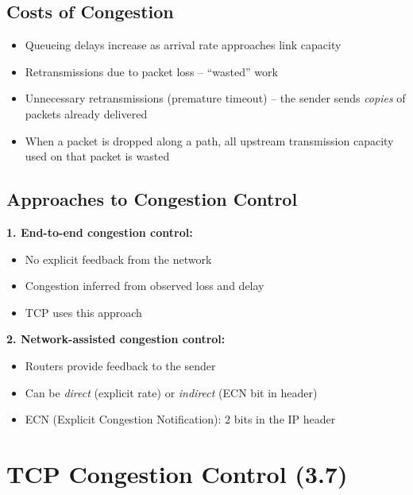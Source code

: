 \subsection{Costs of Congestion}

\begin{warnbox}
\begin{itemize}[noitemsep]
    \item Queueing delays increase as arrival rate approaches link capacity
    \item Retransmissions due to packet loss -- ``wasted'' work
    \item Unnecessary retransmissions (premature timeout) -- the sender sends \emph{copies} of packets already delivered
    \item When a packet is dropped along a path, all upstream transmission capacity used on that packet is wasted
\end{itemize}
\end{warnbox}

\subsection{Approaches to Congestion Control}

\begin{keybox}
\textbf{1. End-to-end congestion control:}
\begin{itemize}[noitemsep]
    \item No explicit feedback from the network
    \item Congestion inferred from observed loss and delay
    \item TCP uses this approach
\end{itemize}

\textbf{2. Network-assisted congestion control:}
\begin{itemize}[noitemsep]
    \item Routers provide feedback to the sender
    \item Can be \emph{direct} (explicit rate) or \emph{indirect} (ECN bit in header)
    \item ECN (Explicit Congestion Notification): 2 bits in the IP header
\end{itemize}
\end{keybox}

\section{TCP Congestion Control (3.7)}


